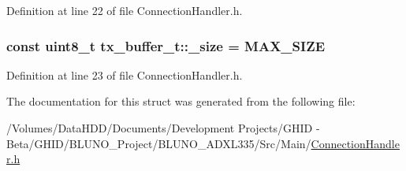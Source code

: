 \-Definition at line 22 of file \-Connection\-Handler.\-h.

\hypertarget{structtx__buffer__t_a9e50e47b9d21ef81014e8325acc2bb3f}{
\subsubsection[{\-\_\-size}]{\setlength{\rightskip}{0pt plus 5cm}const uint8\-\_\-t {\bf tx\-\_\-buffer\-\_\-t\-::\-\_\-size} = {\bf \-M\-A\-X\-\_\-\-S\-I\-Z\-E}}}\label{structtx__buffer__t_a9e50e47b9d21ef81014e8325acc2bb3f}


\-Definition at line 23 of file \-Connection\-Handler.\-h.



\-The documentation for this struct was generated from the following file\-:\begin{DoxyCompactItemize}
\item 
/\-Volumes/\-Data\-H\-D\-D/\-Documents/\-Development Projects/\-G\-H\-I\-D -\/ Beta/\-G\-H\-I\-D/\-B\-L\-U\-N\-O\-\_\-\-Project/\-B\-L\-U\-N\-O\-\_\-\-A\-D\-X\-L335/\-Src/\-Main/\hyperlink{_connection_handler_8h}{\-Connection\-Handler.\-h}\end{DoxyCompactItemize}

